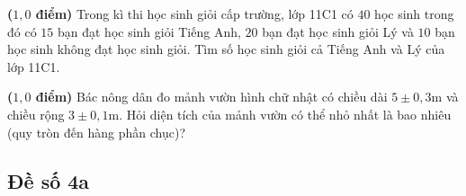 \begin{bt}%
	\textbf{($1,0$ điểm)} Trong kì thi học sinh giỏi cấp trường, lớp 11C1 có $40$ học sinh trong đó có  $15$ bạn đạt học sinh giỏi Tiếng Anh, $20$ bạn đạt học sinh giỏi Lý và $10$ bạn học sinh không đạt học sinh giỏi. Tìm số học sinh giỏi cả Tiếng Anh và Lý của lớp 11C1.
\end{bt}

\begin{bt}%
	\textbf{($1,0$ điểm)} Bác nông dân đo mảnh vườn hình chữ nhật có chiều dài $5 \pm 0,3 \text{m}$ và chiều rộng $3\pm 0,1 \text{m}$. Hỏi diện tích của mảnh vườn có thể nhỏ nhất là bao nhiêu (quy tròn đến hàng phần chục)?
\end{bt}

\subsection{Đề số 4a}
\setcounter{bt}{0}

